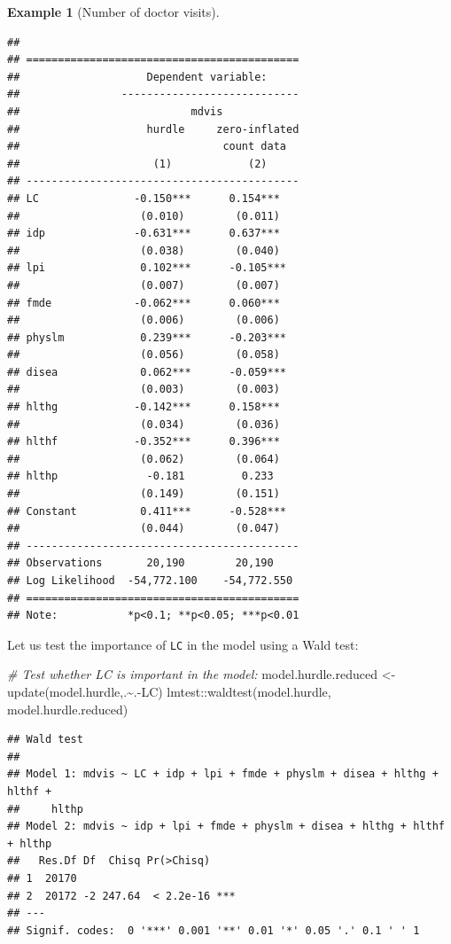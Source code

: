 \documentclass[
  12pt,
]{book}
\newenvironment{Shaded}{\begin{snugshade}}{\end{snugshade}}
\newcommand{\CommentTok}[1]{\textcolor[rgb]{0.56,0.35,0.01}{\textit{#1}}}
\newcommand{\FunctionTok}[1]{\textcolor[rgb]{0.00,0.00,0.00}{#1}}
\newcommand{\NormalTok}[1]{#1}
\newcommand{\OtherTok}[1]{\textcolor[rgb]{0.56,0.35,0.01}{#1}}
\newcommand{\SpecialCharTok}[1]{\textcolor[rgb]{0.00,0.00,0.00}{#1}}
\theoremstyle{definition}
\theoremstyle{definition}
\newtheorem{example}{Example}[chapter]
\theoremstyle{definition}
\theoremstyle{definition}
\theoremstyle{remark}
\begin{document}
\begin{example}[Number of doctor visits]
\begin{verbatim}
## 
## ===========================================
##                    Dependent variable:     
##                ----------------------------
##                           mdvis            
##                    hurdle     zero-inflated
##                                count data  
##                     (1)            (2)     
## -------------------------------------------
## LC               -0.150***      0.154***   
##                   (0.010)        (0.011)   
## idp              -0.631***      0.637***   
##                   (0.038)        (0.040)   
## lpi               0.102***      -0.105***  
##                   (0.007)        (0.007)   
## fmde             -0.062***      0.060***   
##                   (0.006)        (0.006)   
## physlm            0.239***      -0.203***  
##                   (0.056)        (0.058)   
## disea             0.062***      -0.059***  
##                   (0.003)        (0.003)   
## hlthg            -0.142***      0.158***   
##                   (0.034)        (0.036)   
## hlthf            -0.352***      0.396***   
##                   (0.062)        (0.064)   
## hlthp              -0.181         0.233    
##                   (0.149)        (0.151)   
## Constant          0.411***      -0.528***  
##                   (0.044)        (0.047)   
## -------------------------------------------
## Observations       20,190        20,190    
## Log Likelihood  -54,772.100    -54,772.550 
## ===========================================
## Note:           *p<0.1; **p<0.05; ***p<0.01
\end{verbatim}

Let us test the importance of \texttt{LC} in the model using a Wald test:

\begin{Shaded}
\begin{Highlighting}[]
\CommentTok{\# Test whether LC is important in the model:}
\NormalTok{model.hurdle.reduced }\OtherTok{\textless{}{-}} \FunctionTok{update}\NormalTok{(model.hurdle,.}\SpecialCharTok{\textasciitilde{}}\NormalTok{.}\SpecialCharTok{{-}}\NormalTok{LC)}
\NormalTok{lmtest}\SpecialCharTok{::}\FunctionTok{waldtest}\NormalTok{(model.hurdle, model.hurdle.reduced)}
\end{Highlighting}
\end{Shaded}

\begin{verbatim}
## Wald test
## 
## Model 1: mdvis ~ LC + idp + lpi + fmde + physlm + disea + hlthg + hlthf + 
##     hlthp
## Model 2: mdvis ~ idp + lpi + fmde + physlm + disea + hlthg + hlthf + hlthp
##   Res.Df Df  Chisq Pr(>Chisq)    
## 1  20170                         
## 2  20172 -2 247.64  < 2.2e-16 ***
## ---
## Signif. codes:  0 '***' 0.001 '**' 0.01 '*' 0.05 '.' 0.1 ' ' 1
\end{verbatim}


\end{example}
\end{document}
